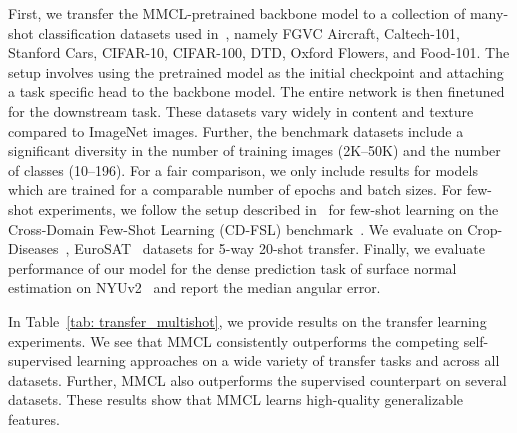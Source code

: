\documentclass[letterpaper]{article} \usepackage{aaai22}  \usepackage{times}  \usepackage{helvet}  \usepackage{courier}  \usepackage[hyphens]{url}  \usepackage{graphicx} \urlstyle{rm} \def\UrlFont{\rm}  \usepackage{natbib}  \usepackage{caption} \DeclareCaptionStyle{ruled}{labelfont=normalfont,labelsep=colon,strut=off} \frenchspacing  \setlength{\pdfpagewidth}{8.5in}  \setlength{\pdfpageheight}{11in}
\begin{document}
First, we transfer the MMCL-pretrained backbone model to a collection of many-shot classification datasets used in~\cite{Ericsson2021HowTransfer}, namely FGVC Aircraft, Caltech-101, Stanford Cars, CIFAR-10, CIFAR-100, DTD, Oxford Flowers, and Food-101. The setup involves using the pretrained model as the initial checkpoint and attaching a task specific head to the backbone model. The entire network is then finetuned for the downstream task. These datasets vary widely in content and texture compared to ImageNet images. Further, the benchmark datasets include a significant diversity in the number of training images (2K--50K) and the number of classes (10--196). For a fair comparison, we only include results for models which are trained for a comparable number of epochs and batch sizes. For few-shot experiments, we follow the setup described in~\cite{Ericsson2021HowTransfer} for few-shot learning on the Cross-Domain Few-Shot Learning (CD-FSL) benchmark~\cite{guo2020broader}. We evaluate on Crop-Diseases~\cite{mohanty2016using}, EuroSAT~\cite{helber2019eurosat} datasets for 5-way 20-shot transfer. Finally, we evaluate performance of our model for the dense prediction task of surface normal estimation on NYUv2~\cite{silberman2012indoor} and report the median angular error. 

In Table~\ref{tab: transfer_multishot}, we provide results on the transfer learning experiments. We see that MMCL consistently outperforms the competing self-supervised learning approaches on a wide variety of transfer tasks and across all datasets. Further, MMCL also outperforms the supervised counterpart on several datasets. These results show that MMCL learns high-quality generalizable features.
\end{document}
